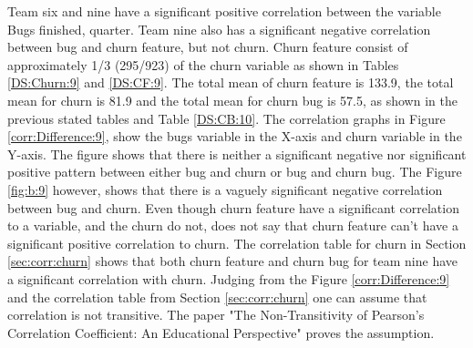 \documentclass[UKenglish]{ifimaster}  %
\begin{document}
Team six and nine have a significant positive correlation between the variable Bugs finished, quarter. Team nine also has a significant negative correlation between bug and churn feature, but not churn. Churn feature consist of approximately 1/3 (295/923) of the churn variable as shown in Tables \ref{DS:Churn:9} and \ref{DS:CF:9}.  The total mean of churn feature is 133.9, the total mean for churn is 81.9 and the total mean for churn bug is 57.5, as shown in the previous stated tables and Table \ref{DS:CB:10}. The correlation graphs in Figure \ref{corr:Difference:9}, show the bugs variable in the X-axis and churn variable in the Y-axis. The figure shows that there is neither a significant negative nor significant positive pattern between either bug and churn or bug and churn bug. The Figure \ref{fig:b:9} however, shows that there is a vaguely significant negative correlation between bug and churn. Even though churn feature have a significant correlation to a variable, and the churn do not, does not say that churn feature can't have a significant positive correlation to churn. The correlation table for churn in Section \ref{sec:corr:churn} shows that both churn feature and churn bug for team nine have a significant correlation with churn. Judging from the Figure \ref{corr:Difference:9} and the correlation table from Section \ref{sec:corr:churn} one can assume that correlation is not transitive. The paper "The Non-Transitivity of Pearson's Correlation Coefficient: An Educational Perspective" \parencite{corr:transitive} proves the assumption. 

 
\end{document}
